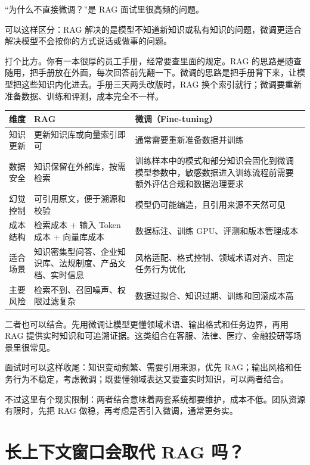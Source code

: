 \documentclass[10pt,a4paper]{ctexart}
\begin{document}
“为什么不直接微调？”是 RAG 面试里很高频的问题。



可以这样区分：RAG 解决的是模型不知道新知识或私有知识的问题，微调更适合解决模型不会按你的方式说话或做事的问题。



打个比方。你有一本很厚的员工手册，经常要查里面的规定。RAG 的思路是随查随用，把手册放在外面，每次回答前先翻一下。微调的思路是把手册背下来，让模型把这些知识内化进去。手册三天两头改版时，RAG 换个索引就行；微调要重新准备数据、训练和评测，成本完全不一样。


{\footnotesize
\begin{tabularx}{\textwidth}{|X|X|X|}
\hline
\textbf{维度} & \textbf{RAG} & \textbf{微调（Fine-tuning）} \\
\hline
知识更新 & 更新知识库或向量索引即可 & 通常需要重新准备数据并训练 \\
\hline
数据安全 & 知识保留在外部库，按需检索 & 训练样本中的模式和部分知识会固化到微调模型参数中，敏感数据进入训练流程前需要额外评估合规和数据治理要求 \\
\hline
幻觉控制 & 可引用原文，便于溯源和校验 & 模型仍可能编造，且引用来源不天然可见 \\
\hline
成本结构 & 检索成本 + 输入 Token 成本 + 向量库成本 & 数据标注、训练 GPU、评测和版本管理成本 \\
\hline
适合场景 & 知识密集型问答、企业知识库、法规制度、产品文档、实时信息 & 风格适配、格式控制、领域术语对齐、固定任务行为优化 \\
\hline
主要风险 & 检索不到、召回噪声、权限过滤复杂 & 数据过拟合、知识过期、训练和回滚成本高 \\
\hline
\end{tabularx}
}



二者也可以结合。先用微调让模型更懂领域术语、输出格式和任务边界，再用 RAG 提供实时知识和可追溯证据。这类组合在客服、法律、医疗、金融投研等场景里很常见。



面试时可以这样收尾：知识变动频繁、需要引用来源，优先 RAG；输出风格和任务行为不稳定，考虑微调；既要懂领域表达又要查实时知识，可以两者结合。



不过这里有个现实限制：两者结合意味着两套系统都要维护，成本不低。团队资源有限时，先把 RAG 做稳，再考虑是否引入微调，通常更务实。



\section{长上下文窗口会取代 RAG 吗？}
\end{document}
